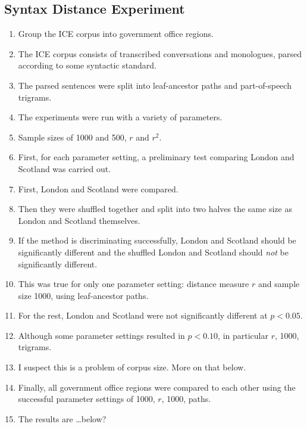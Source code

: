 \documentclass[11pt]{article}
\begin{document}
\subsection{Syntax Distance Experiment}
\begin{enumerate}
\item Group the ICE corpus into government office regions.
\item The ICE corpus consists of transcribed conversations and
  monologues, parsed according to some syntactic standard.
\item The parsed sentences were split into leaf-ancestor paths and
  part-of-speech trigrams.
\item The experiments were run with a variety of parameters.
\item Sample sizes of 1000 and 500, $r$ and $r^2$.
\item First, for each parameter setting, a preliminary test comparing
  London and Scotland was carried out.
\item First, London and Scotland were compared.
\item Then they were shuffled together and split into two halves the
  same size as London and Scotland themselves.
\item If the method is discriminating successfully, London and
  Scotland should be significantly different and the shuffled London
  and Scotland should {\em not} be significantly different.
\item This was true for only one parameter setting: distance measure
  $r$ and sample size 1000, using leaf-ancestor paths.
\item For the rest, London and Scotland were not significantly
  different at $p < 0.05$.
\item Although some parameter settings resulted in $p < 0.10$, in
  particular $r$, 1000, trigrams.
\item I suspect this is a problem of corpus size. More on that below.
\item Finally, all government office regions were compared to each
  other using the successful parameter settings of 1000, $r$, 1000,
  paths.
\item The results are \ldots below?
\end{enumerate}
\end{document}
